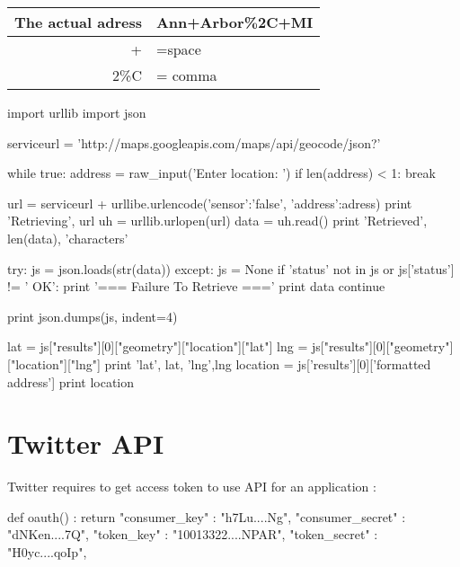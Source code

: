 \documentclass[a4paper,12pt]{report}
\begin{document}
\begin{tabular}{r|l}
\hline
The actual adress & Ann+Arbor\%2C+MI \\
\hline
+ & =space \\
\hline
2\%C & = comma \\
\hline
\end{tabular}

\begin{tcolorbox}
\begin{python}
import urllib
import json

serviceurl = 'http://maps.googleapis.com/maps/api/geocode/json?'

while true:
	address = raw_input('Enter location: ') %
	if len(address) < 1: break
	
	url = serviceurl 
	+ urllibe.urlencode({'sensor':'false', 'address':adress}) 
	print 'Retrieving', url
	uh = urllib.urlopen(url)
	data = uh.read() %
	print 'Retrieved', len(data), 'characters'
	
	try: js = json.loads(str(data)) 
	except: js = None
	if 'status' not in js or js['status'] != ' OK': 
		print '=== Failure To Retrieve ==='
		print data
		continue
	
	print json.dumps(js, indent=4) %
	
	lat = js["results"][0]["geometry"]["location"]["lat"]
	lng = js["results"][0]["geometry"]["location"]["lng"]
	print 'lat', lat, 'lng',lng
	location = js['results'][0]['formatted address']
	print location
\end{python}
\end{tcolorbox}

\section{Twitter API}
Twitter requires to get access token to use API for an application :

\begin{tcolorbox}
\begin{python}
def oauth() :
	return {
		"consumer_key" : "h7Lu....Ng",
		"consumer_secret" : "dNKen....7Q",
		"token_key" : "10013322....NPAR",
		"token_secret" : "H0yc....qoIp",
	}
\end{python}
\end{tcolorbox}
\end{document}
